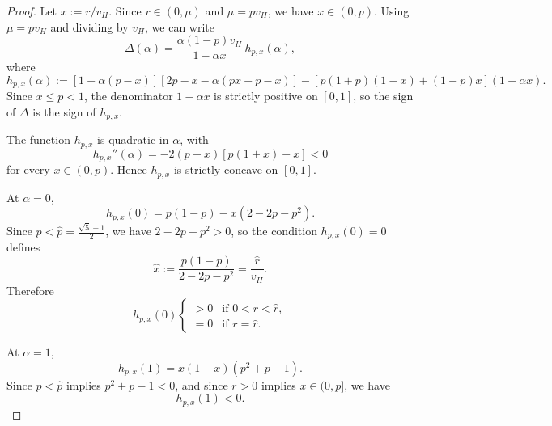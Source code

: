 \documentclass[11pt]{article}
\theoremstyle{plain}
\theoremstyle{definition}
\theoremstyle{plain}
\theoremstyle{plain}
\theoremstyle{plain}
\theoremstyle{plain}
\numberwithin{equation}{section}
\begin{document}
\begin{proof}
    Let $x := r/v_H$. Since $r \in (0,\mu)$ and $\mu = p v_H$, we have $x \in (0,p)$. Using $\mu = p v_H$ and dividing by $v_H$, we can write
    \begin{equation*}
        \Delta(\alpha) = \frac{\alpha (1-p) v_H}{1-\alpha x} \, h_{p,x}(\alpha),
    \end{equation*}
    where
    \begin{equation*}
        h_{p,x}(\alpha) := \left[1+\alpha (p-x)\right]\left[2p-x-\alpha (px+p-x)\right] - \left[p(1+p)(1-x)+(1-p)x\right](1-\alpha x).
    \end{equation*}
    Since $x \leq p < 1$, the denominator $1-\alpha x$ is strictly positive on $[0,1]$, so the sign of $\Delta$ is the sign of $h_{p,x}$.

    \vspace{2mm}

    \noindent The function $h_{p,x}$ is quadratic in $\alpha$, with
    \begin{equation*}
        h_{p,x}''(\alpha) = -2(p-x)\left[p(1+x)-x\right] < 0
    \end{equation*}
    for every $x \in (0,p)$. Hence $h_{p,x}$ is strictly concave on $[0,1]$.

    \vspace{2mm}

    \noindent At $\alpha = 0$,
    \begin{equation*}
        h_{p,x}(0) = p(1-p) - x(2-2p-p^2).
    \end{equation*}
    Since $p < \hat{p} = \frac{\sqrt{5}-1}{2}$, we have $2-2p-p^2 > 0$, so the condition $h_{p,x}(0)=0$ defines
    \begin{equation*}
        \hat{x} := \frac{p(1-p)}{2-2p-p^2} = \frac{\hat{r}}{v_H}.
    \end{equation*}
    Therefore
    \begin{equation*}
        h_{p,x}(0) \begin{cases}
            > 0 & \text{if } 0 < r < \hat{r}, \\[3pt]
            = 0 & \text{if } r = \hat{r}.
        \end{cases}
    \end{equation*}

    \vspace{2mm}

    \noindent At $\alpha = 1$,
    \begin{equation*}
        h_{p,x}(1) = x(1-x)(p^2+p-1).
    \end{equation*}
    Since $p < \hat{p}$ implies $p^2+p-1 < 0$, and since $r > 0$ implies $x \in (0,p]$, we have
    \begin{equation*}
        h_{p,x}(1) < 0.
    \end{equation*}


\end{proof}
\end{document}

